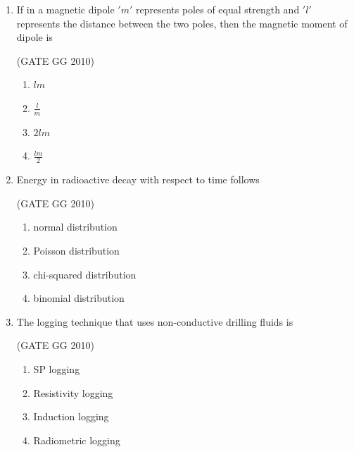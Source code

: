 \documentclass[journal]{IEEEtran}
\begin{document}
\begin{enumerate}[start=26]
\begin{enumerate}
\end{enumerate}

\item If in a magnetic dipole $'m'$ represents poles of equal strength and $'l'$ represents the distance between the two poles, then the magnetic moment of dipole is

\hfill{(GATE GG 2010)}

\begin{enumerate}
    \item $lm$
    \item $\frac{l}{m}$
    \item $2lm$
    \item $\frac{lm}{2}$
\end{enumerate}

\item  Energy in radioactive decay with respect to time follows

\hfill{(GATE GG 2010)}

\begin{enumerate}
    \item normal distribution
\item Poisson distribution
\item chi-squared distribution
\item binomial distribution
\end{enumerate}

\item The logging technique that uses non-conductive drilling fluids is

\hfill{(GATE GG 2010)}

\begin{enumerate}
 \item  SP logging
\item  Resistivity logging
\item Induction logging
\item Radiometric logging
\end{enumerate}


\end{enumerate}
\end{document}

